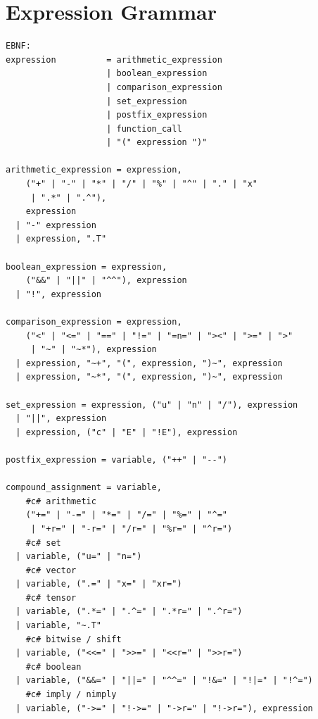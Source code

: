 \documentclass{report}
\begin{document}
\section{Expression Grammar}
\begin{verbatim}
EBNF:
expression          = arithmetic_expression
                    | boolean_expression
                    | comparison_expression
                    | set_expression
                    | postfix_expression
                    | function_call
                    | "(" expression ")"

arithmetic_expression = expression,
    ("+" | "-" | "*" | "/" | "%" | "^" | "." | "x"
     | ".*" | ".^"),
    expression
  | "-" expression
  | expression, ".T"

boolean_expression = expression,
    ("&&" | "||" | "^^"), expression
  | "!", expression

comparison_expression = expression,
    ("<" | "<=" | "==" | "!=" | "=n=" | "><" | ">=" | ">"
     | "~" | "~*"), expression
  | expression, "~+", "(", expression, ")~", expression
  | expression, "~*", "(", expression, ")~", expression

set_expression = expression, ("u" | "n" | "/"), expression
  | "||", expression
  | expression, ("c" | "E" | "!E"), expression

postfix_expression = variable, ("++" | "--")

compound_assignment = variable,
    #c# arithmetic
    ("+=" | "-=" | "*=" | "/=" | "%=" | "^=" 
     | "+r=" | "-r=" | "/r=" | "%r=" | "^r=")
    #c# set
  | variable, ("u=" | "n=")
    #c# vector
  | variable, (".=" | "x=" | "xr=")
    #c# tensor
  | variable, (".*=" | ".^=" | ".*r=" | ".^r=")
  | variable, "~.T"
    #c# bitwise / shift
  | variable, ("<<=" | ">>=" | "<<r=" | ">>r=")
    #c# boolean
  | variable, ("&&=" | "||=" | "^^=" | "!&=" | "!|=" | "!^=")
    #c# imply / nimply
  | variable, ("->=" | "!->=" | "->r=" | "!->r="), expression
\end{verbatim}
\end{document}
